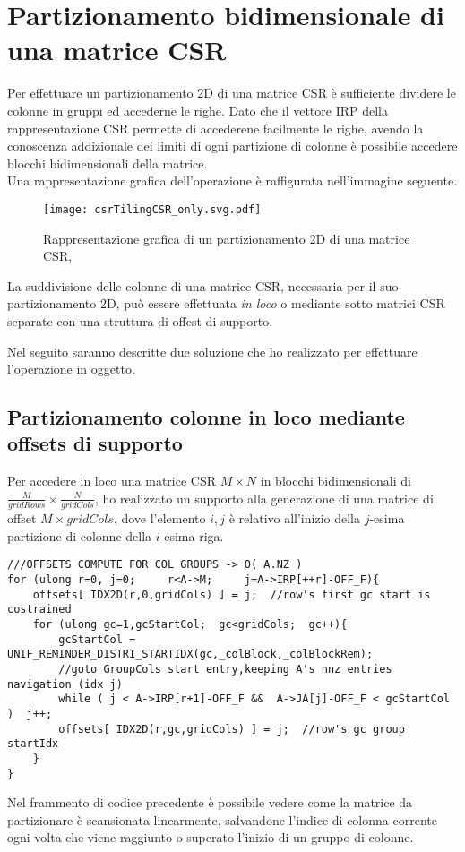 \section{Partizionamento bidimensionale di una matrice CSR}	\label{chSpMMAux:CSR2DPARTI}
Per effettuare un partizionamento 2D di una matrice CSR è sufficiente
dividere le colonne in gruppi ed accederne le righe.
Dato che il vettore IRP della rappresentazione CSR permette di accederene facilmente le righe,
avendo la conoscenza addizionale dei limiti di ogni partizione di colonne è possibile accedere blocchi bidimensionali
della matrice.\\
Una rappresentazione grafica dell'operazione è raffigurata nell'immagine seguente.\\
\begin{figure}[H]
  \centering \texttt{[image: csrTilingCSR\_only.svg.pdf]} 
  \caption[partizionamento 2D CSR]
  {Rappresentazione grafica di un partizionamento 2D di una matrice CSR, }
  \decoRule \label{fig:csrTilingCSR_only}
\end{figure}

La suddivisione delle colonne di una matrice CSR, necessaria per il suo partizionamento 2D, 
può essere effettuata \emph{in loco} o mediante sotto matrici CSR separate con una struttura di offest di supporto.

Nel seguito saranno descritte due soluzione che ho realizzato per effettuare l'operazione in oggetto.\\

\subsection{Partizionamento colonne in loco mediante offsets di supporto} 
\label{chSpMMAux:csrColPartitioning}
Per accedere in loco una matrice CSR $M\times N$ in blocchi bidimensionali di $\frac{M}{gridRows}\times\frac{N}{gridCols}$, 
ho realizzato un supporto alla generazione di una matrice di offset $M\times gridCols$, dove l'elemento
$i,j$ è relativo all'inizio della $j$-esima partizione di colonne della $i$-esima riga.\\
\begin{lstlisting}
///OFFSETS COMPUTE FOR COL GROUPS -> O( A.NZ )
for (ulong r=0, j=0;     r<A->M;     j=A->IRP[++r]-OFF_F){
    offsets[ IDX2D(r,0,gridCols) ] = j;  //row's first gc start is costrained
    for (ulong gc=1,gcStartCol;  gc<gridCols;  gc++){
        gcStartCol = UNIF_REMINDER_DISTRI_STARTIDX(gc,_colBlock,_colBlockRem);
        //goto GroupCols start entry,keeping A's nnz entries navigation (idx j)
        while ( j < A->IRP[r+1]-OFF_F &&  A->JA[j]-OFF_F < gcStartCol )  j++;
        offsets[ IDX2D(r,gc,gridCols) ] = j;  //row's gc group startIdx
    }
}
\end{lstlisting}
Nel frammento di codice precedente è possibile vedere come la matrice da partizionare è scansionata
linearmente, salvandone l'indice di colonna corrente ogni volta che 
viene raggiunto o superato l'inizio di un gruppo di colonne.\\


